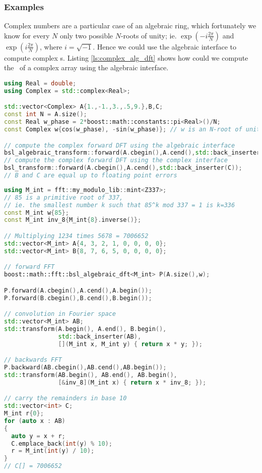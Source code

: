 \subsubsection*{Examples}
Complex numbers are a particular case of an algebraic ring, which fortunately we
know for every $N$ only two possible $N$-roots of unity; ie. 
$\exp(-i \frac{2\pi}{N})$
and
$\exp(i \frac{2\pi}{N})$, where $i=\sqrt{-1}$. Hence we could use the algebraic
interface to compute complex \dft s. Listing \ref{ls:complex_alg_dft} shows how
could we compute the \dft\ of a complex array using the algebraic interface.
\begin{lstlisting}[language=C++,caption=Complex DFT using the generic interface.,label=ls:complex_alg_dft]
using Real = double;
using Complex = std::complex<Real>;

std::vector<Complex> A{1.,-1.,3.,.5,9.},B,C;
const int N = A.size();
const Real w_phase = 2*boost::math::constants::pi<Real>()/N;
const Complex w{cos(w_phase), -sin(w_phase)}; // w is an N-root of unity in the complex

// compute the complex forward DFT using the algebraic interface
bsl_algebraic_transform::forward(A.cbegin(),A.cend(),std::back_inserter(B), w);
// compute the complex forward DFT using the complex interface
bsl_transform::forward(A.cbegin(),A.cend(),std::back_inserter(C));
// B and C are equal up to floating point errors
\end{lstlisting}
\begin{lstlisting}[language=C++,caption=Integer fast multiplication.]
using M_int = fft::my_modulo_lib::mint<Z337>;
// 85 is a primitive root of 337,
// ie. the smallest number k such that 85^k mod 337 = 1 is k=336
const M_int w{85};
const M_int inv_8{M_int{8}.inverse()};

// Multiplying 1234 times 5678 = 7006652
std::vector<M_int> A{4, 3, 2, 1, 0, 0, 0, 0};
std::vector<M_int> B{8, 7, 6, 5, 0, 0, 0, 0};

// forward FFT
boost::math::fft::bsl_algebraic_dft<M_int> P(A.size(),w);

P.forward(A.cbegin(),A.cend(),A.begin());
P.forward(B.cbegin(),B.cend(),B.begin());

// convolution in Fourier space
std::vector<M_int> AB;
std::transform(A.begin(), A.end(), B.begin(),
               std::back_inserter(AB),
               [](M_int x, M_int y) { return x * y; });

// backwards FFT
P.backward(AB.cbegin(),AB.cend(),AB.begin());
std::transform(AB.begin(), AB.end(), AB.begin(),
               [&inv_8](M_int x) { return x * inv_8; });

// carry the remainders in base 10
std::vector<int> C;
M_int r{0};
for (auto x : AB)
{
  auto y = x + r;
  C.emplace_back(int(y) % 10);
  r = M_int(int(y) / 10);
}
// C[] = 7006652
\end{lstlisting}

